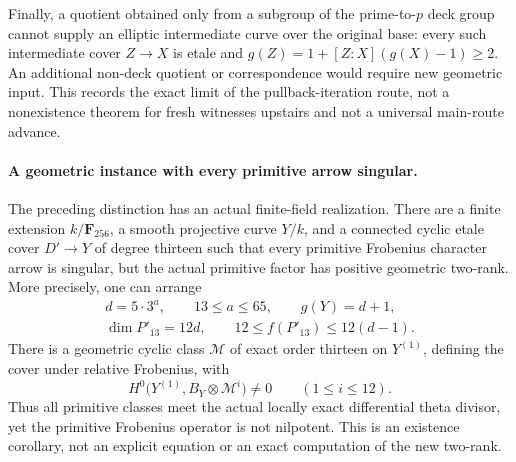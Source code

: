 \documentclass[11pt,a4paper]{article}
\begin{document}
Finally, a quotient obtained only from a subgroup of the
prime-to-$p$ deck group cannot supply an elliptic intermediate
curve over the original base: every such intermediate cover
$Z\to X$ is etale and
$g(Z)=1+[Z:X](g(X)-1)\ge2$.
An additional non-deck quotient or correspondence would require
new geometric input. This records the exact limit of the
pullback-iteration route, not a nonexistence theorem for fresh
witnesses upstairs and not a universal main-route advance.


\paragraph{A geometric instance with every primitive arrow singular.}
The preceding distinction has an actual finite-field realization.
There are a finite extension $k/\mathbf F_{256}$, a smooth
projective curve $Y/k$, and a connected cyclic etale cover
$D'\to Y$ of degree thirteen such that every primitive
Frobenius character arrow is singular, but the actual primitive
factor has positive geometric two-rank. More precisely, one
can arrange
\[
 \begin{gathered}
 d=5\cdot3^a,\qquad 13\le a\le65,\qquad g(Y)=d+1,\\
 \dim P'_{13}=12d,\qquad 12\le f(P'_{13})\le12(d-1).
 \end{gathered}
 \tag{PIA.1}
\]
There is a geometric cyclic class $\mathcal M$ of exact order
thirteen on $Y^{(1)}$, defining the cover under relative
Frobenius, with
\[
 H^0\bigl(Y^{(1)},B_Y\otimes\mathcal M^i\bigr)\ne0
                           \qquad(1\le i\le12).
 \tag{PIA.2}
\]
Thus all primitive classes meet the actual locally exact
differential theta divisor, yet the primitive Frobenius operator
is not nilpotent. This is an existence corollary, not an
explicit equation or an exact computation of the new two-rank.
\end{document}
